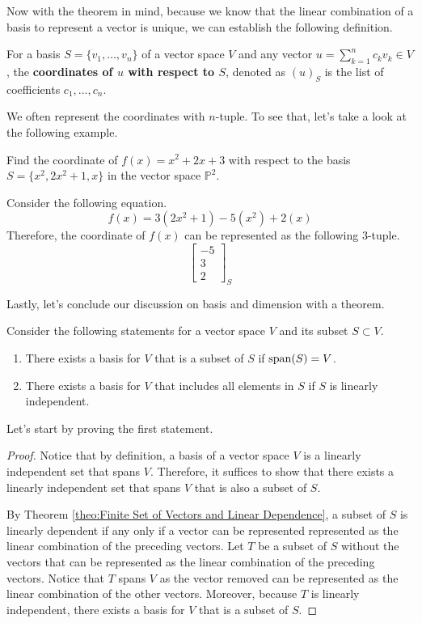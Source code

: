 \documentclass[../main.tex]{subfiles}
\begin{document}
Now with the theorem in mind, because we know that the linear
combination of a basis to represent a vector is unique, we can
establish the following definition.

\begin{definition}
For a basis $S = \{ v_1, \ldots, v_n \}$ of a vector space $V$
and any vector $u = \sum_{k=1}^n c_k v_k \in V$, the
\textbf{coordinates of $u$ with respect to $S$}, denoted as $(u)_S$
is the list of coefficients $c_1, \ldots, c_n$.
\end{definition}

We often represent the coordinates with $n$-tuple. To see that,
let's take a look at the following example.

\begin{problem}
Find the coordinate of $f(x) = x^2 + 2x + 3$ with respect to the
basis $S = \{ x^2, 2x^2 + 1, x \}$ in the vector space $\mathbb{P}^2$.
\end{problem}
\begin{solution}
Consider the following equation.
\[
f(x)
= 3 \left( 2x^2 + 1 \right) - 5 \left( x^2 \right) + 2(x)
\]
Therefore, the coordinate of $f(x)$ can be represented as the
following $3$-tuple.
\[
\begin{bmatrix}
    -5 \\
    3 \\
    2
\end{bmatrix}_S
\]
\end{solution}

Lastly, let's conclude our discussion on basis and dimension with
a theorem.

\begin{theorem}
Consider the following statements for a vector space $V$ and
its subset $S \subset V$.
\begin{enumerate}[noitemsep]
\item
There exists a basis for $V$ that is a subset of $S$ if $\operatorname{span}(S) =
V$.
\item
There exists a basis for $V$ that includes all elements in $S$ if
$S$ is linearly independent.
\end{enumerate}
\end{theorem}

Let's start by proving the first statement.

\begin{proof}
Notice that by definition, a basis of a vector space $V$ is a linearly
independent set that spans $V$. Therefore, it suffices to show that
there exists a linearly independent set that spans $V$ that is also
a subset of $S$.

By Theorem \ref{theo:Finite Set of Vectors and Linear Dependence},
a subset of $S$ is linearly dependent if any only if a vector can be
represented represented as the linear combination of the preceding
vectors. Let $T$ be a subset of $S$ without the vectors that can be
represented as the linear combination of the preceding vectors.
Notice that $T$ spans $V$ as the vector removed can be represented
as the linear combination of the other vectors. Moreover, because
$T$ is linearly independent, there exists a basis for $V$ that is a
subset of $S$.
\end{proof}
\end{document}
